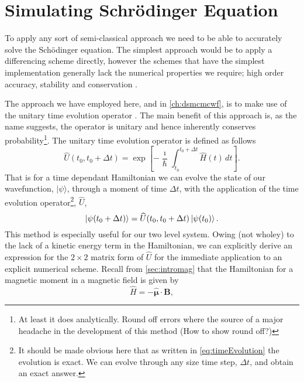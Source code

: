 \section{Simulating Schr\"odinger Equation}

To apply any sort of semi-classical approach we need to be able to accurately solve the Sch\"odinger equation.
The simplest approach would be to apply a differencing scheme directly, however the schemes that have the simplest implementation generally lack the numerical properties we require; high order accuracy, stability and conservation \cite{mi_eng}. %

The approach we have employed here, and in \autoref{ch:dsmcmcwf}, is to make use of the unitary time evolution operator \cite{?}.
The main benefit of this approach is, as the name suggests, the operator is unitary and hence inherently conserves probability\footnote{At least it does analytically. Round off errors where the source of a major headache in the development of this method (How to show round off?)}.
The unitary time evolution operator is defined as follows
\begin{equation}
    \widehat{U}(t_0,t_0+\Delta t) = \exp\left[-\frac{\imath}{\hbar}\int_{t_0}^{t_0+\Delta t} \widehat{H}(t)\,dt \right]. \label{eq:timeEvolution}
\end{equation}
That is for a time dependant Hamiltonian we can evolve the state of our wavefunction, $\vert \psi \rangle$, through a moment of time $\Delta t$, with the application of the time evolution operator\footnote{It should be made obvious here that as written in \autoref{eq:timeEvolution} the evolution is exact. We can evolve through any size time step, $\Delta t$, and obtain an exact answer.}, $\widehat{U}$,
\begin{equation*}
    \ket{ \psi (t_0+\Delta t) } = \widehat{U}(t_0,t_0+\Delta t) \ket{ \psi (t_0) }.
\end{equation*}
This method is especially useful for our two level system.
Owing (not wholey) to the lack of a kinetic energy term in the Hamiltonian, we can explicitly derive an expression for the $2\times2$ matrix form of $\widehat{U}$ for the immediate application to an explicit numerical scheme.
Recall from \autoref{sec:intromag} that the Hamiltonian for a magnetic moment in a magnetic field is given by
\begin{equation*}
    \widehat{H} = -\hat{\boldsymbol{\mu}} \cdot \mathbf{B},
\end{equation*}
